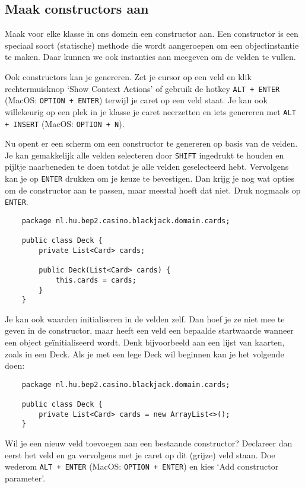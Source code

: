 \documentclass[dutch,a4paper,12pt,doubleside]{book}
\begin{document}
\subsection{Maak constructors aan}
Maak voor elke klasse in ons domein een constructor aan.
Een constructor is een speciaal soort (statische) methode die wordt aangeroepen
om een objectinstantie te maken. Daar kunnen we ook instanties aan meegeven om 
de velden te vullen.

Ook constructors kan je genereren. Zet je cursor op een veld en klik 
rechtermuisknop `Show Context Actions' of gebruik de hotkey \texttt{ALT + ENTER} 
(MacOS: \texttt{OPTION + ENTER}) terwijl je caret op een veld staat. 
Je kan ook willekeurig op een plek in je klasse je caret neerzetten en iets genereren 
met \texttt{ALT + INSERT} (MacOS: \texttt{OPTION + N}).

Nu opent er een scherm om een constructor te genereren op basis van de velden. Je kan 
gemakkelijk alle velden selecteren door \texttt{SHIFT} ingedrukt te houden en 
pijltje naarbeneden te doen totdat je alle velden geselecteerd hebt. Vervolgens kan je 
op \texttt{ENTER} drukken om je keuze te bevestigen. Dan krijg je nog wat opties om de 
constructor aan te passen, maar meestal hoeft dat niet. Druk nogmaals op \texttt{ENTER}.

\begin{verbatim}
    package nl.hu.bep2.casino.blackjack.domain.cards;

    public class Deck {
        private List<Card> cards;

        public Deck(List<Card> cards) {
            this.cards = cards;
        }
    }
\end{verbatim}

Je kan ook waarden initialiseren in de velden zelf. Dan hoef je ze niet mee te geven 
in de constructor, maar heeft een veld een bepaalde startwaarde wanneer een object 
geïnitialiseerd wordt. Denk bijvoorbeeld aan een lijst van kaarten, zoals in een Deck.
Als je met een lege Deck wil beginnen kan je het volgende doen:

\begin{verbatim}
    package nl.hu.bep2.casino.blackjack.domain.cards;

    public class Deck {
        private List<Card> cards = new ArrayList<>();
    }
\end{verbatim}

Wil je een nieuw veld toevoegen aan een bestaande constructor? Declareer dan eerst het veld
en ga vervolgens met je caret op dit (grijze) veld staan. 
Doe wederom \texttt{ALT + ENTER} (MacOS: \texttt{OPTION + ENTER})
en kies `Add constructor parameter'.
\end{document}
